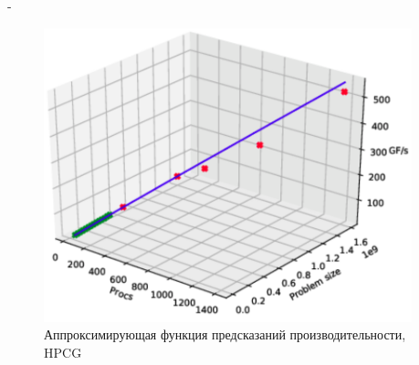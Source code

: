 \documentclass[unicode, t, 11pt]{beamer}%
\newlength{\mylen}
\begin{document}
\begin{frame}
\begin{columns}[T]
\begin{column}{\mylen}
		 			\end{column}
		 			\begin{column}{\dimexpr\textwidth-\mylen}
			 			\begin{figure}
							\captionsetup{font=tiny, labelfont=tiny}
							\includegraphics[width=\textwidth]{./images/hpcg_perf}
							\caption{Аппроксимирующая функция предсказаний производительности, HPCG}
						\end{figure}
					\end{column}
		 		\end{columns}
			\end{frame}
		
\end{document}
